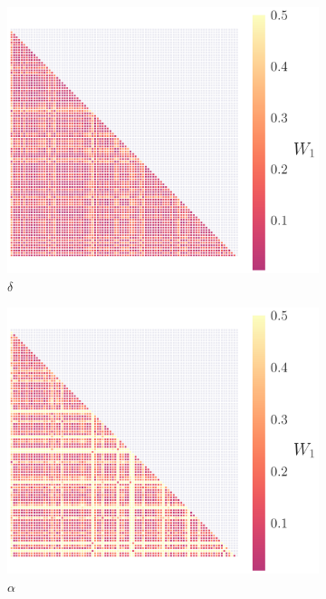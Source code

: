 \documentclass[fleqn,usenatbib,useAMS]{mnras}
\begin{document}
\begin{figure}
	\medskip
	\begin{subfigure}[b]{0.3\textwidth}
		\includegraphics[width=\textwidth]{images/WD_4}
		\caption{$\delta$}
	\end{subfigure}
	\hfill	
	\begin{subfigure}[b]{0.3\textwidth}
		\includegraphics[width=\textwidth]{images/WD_5}
		\caption{$\alpha$}
	\end{subfigure}
	\hfill	
	\begin{subfigure}[b]{0.3\textwidth}

\end{subfigure}
\end{figure}
\end{document}
